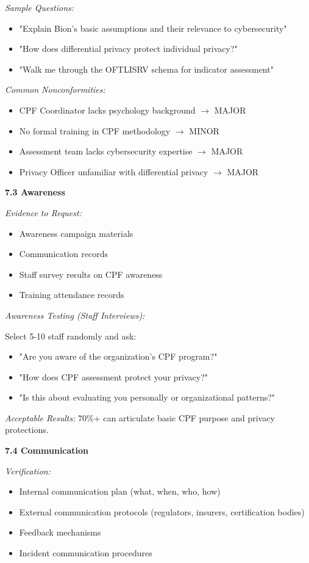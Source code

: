 \documentclass[11pt,a4paper]{article}
\begin{document}
\textit{Sample Questions:}
\begin{itemize}
\item "Explain Bion's basic assumptions and their relevance to cybersecurity"
\item "How does differential privacy protect individual privacy?"
\item "Walk me through the OFTLISRV schema for indicator assessment"
\end{itemize}

\textit{Common Nonconformities:}
\begin{itemize}
\item CPF Coordinator lacks psychology background $\rightarrow$ MAJOR
\item No formal training in CPF methodology $\rightarrow$ MINOR
\item Assessment team lacks cybersecurity expertise $\rightarrow$ MAJOR
\item Privacy Officer unfamiliar with differential privacy $\rightarrow$ MAJOR
\end{itemize}

\textbf{7.3 Awareness}

\textit{Evidence to Request:}
\begin{itemize}
\item Awareness campaign materials
\item Communication records
\item Staff survey results on CPF awareness
\item Training attendance records
\end{itemize}

\textit{Awareness Testing (Staff Interviews):}

Select 5-10 staff randomly and ask:
\begin{itemize}
\item "Are you aware of the organization's CPF program?"
\item "How does CPF assessment protect your privacy?"
\item "Is this about evaluating you personally or organizational patterns?"
\end{itemize}

\textit{Acceptable Results:} 70\%+ can articulate basic CPF purpose and privacy protections.

\textbf{7.4 Communication}

\textit{Verification:}
\begin{itemize}
\item Internal communication plan (what, when, who, how)
\item External communication protocols (regulators, insurers, certification bodies)
\item Feedback mechanisms
\item Incident communication procedures
\end{itemize}
\end{document}
